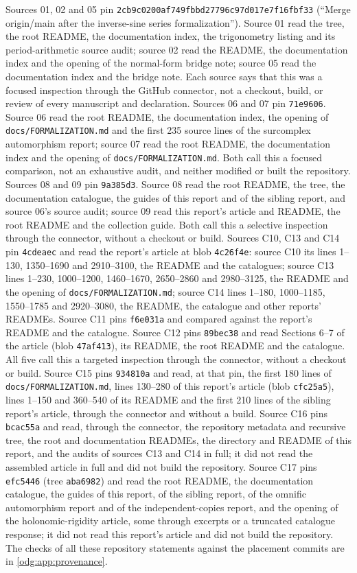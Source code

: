 \documentclass[11pt,oneside]{article}
\numberwithin{equation}{section}
\theoremstyle{definition}
\theoremstyle{remark}
\newcommand{\pin}{\texttt{2cb9c0200af749fbbd27796c97d017e7f16fbf33}}
\newcommand{\fn}[1]{\nolinkurl{#1}}
\begin{document}
Sources 01, 02 and 05 pin \pin{} (``Merge origin/main after the inverse-sine
series formalization''). Source 01 read the tree, the root README, the
documentation index, the trigonometry listing and its period-arithmetic
source audit; source 02 read the README, the documentation index and the
opening of the normal-form bridge note; source 05 read the documentation
index and the bridge note. Each source says that this was a focused
inspection through the GitHub connector, not a checkout, build, or review of
every manuscript and declaration. Sources 06 and 07 pin \texttt{71e9606}.
Source 06 read the root README, the documentation index, the opening of
\fn{docs/FORMALIZATION.md} and the first 235 source lines of the surcomplex
automorphism report; source 07 read the root README, the documentation index
and the opening of \fn{docs/FORMALIZATION.md}. Both call this a focused
comparison, not an exhaustive audit, and neither modified or built the
repository. Sources 08 and 09 pin \texttt{9a385d3}. Source 08 read the root
README, the tree, the documentation catalogue, the guides of this report and
of the sibling report, and source 06's source audit; source 09 read this
report's article and README, the root README and the collection guide. Both
call this a selective inspection through the connector, without a checkout or
build. Sources C10, C13 and C14 pin \texttt{4cdeaec} and read the report's
article at blob \texttt{4c26f4e}: source C10 its lines 1--130, 1350--1690 and
2910--3100, the README and the catalogues; source C13 lines 1--230, 1000--1200,
1460--1670, 2650--2860 and 2980--3125, the README and the opening of
\fn{docs/FORMALIZATION.md}; source C14 lines 1--180, 1000--1185, 1550--1785 and
2920--3080, the README, the catalogue and other reports' READMEs. Source C11 pins
\texttt{f6e031a} and compared against the report's README and the catalogue. Source
C12 pins \texttt{89bec38} and read Sections 6--7 of the article (blob
\texttt{47af413}), its README, the root README and the catalogue. All five call this a
targeted inspection through the connector, without a checkout or build. Source C15 pins
\texttt{934810a} and read, at that pin, the first 180 lines of
\fn{docs/FORMALIZATION.md}, lines 130--280 of this report's article (blob
\texttt{cfc25a5}), lines 1--150 and 360--540 of its README and the first 210 lines of the
sibling report's article, through the connector and without a build. Source C16 pins
\texttt{bcac55a} and read, through the connector, the repository metadata and recursive tree,
the root and documentation READMEs, the directory and README of this report, and the audits
of sources C13 and C14 in full; it did not read the assembled article in full and did not
build the repository. Source C17 pins \texttt{efc5446} (tree \texttt{aba6982}) and read
the root README, the documentation catalogue, the guides of this report, of the sibling
report, of the omnific automorphism report and of the independent-copies report, and the
opening of the holonomic-rigidity article, some through excerpts or a truncated catalogue
response; it did not read this report's article and did not build the repository. The checks of
all these repository statements against the placement commits are in
\cref{odg:app:provenance}.
\end{document}
